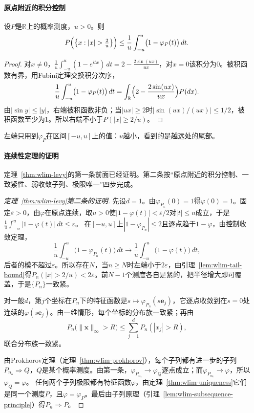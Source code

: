 \paragraph{原点附近的积分控制}
\begin{lemma}[尾部概率的特征函数界]
\label{lem:wlim-tail-bound}
设$P$是$\mathbb R$上的概率测度，$u>0$。则
\[
  P\Bigl(\bigl\{x:|x|>\tfrac2u\bigr\}\Bigr)\leq\frac1u\int_{-u}^u\bigl(1-\varphi_P(t)\bigr)\,dt.
\]
\end{lemma}

\begin{proof}
对$x\neq0$，$\frac1u\int_{-u}^u(1-e^{itx})\,dt=2-\frac{2\sin(ux)}{ux}$，对$x=0$该积分为$0$。被积函数有界，用Fubini定理交换积分次序，
\[
  \frac1u\int_{-u}^u\bigl(1-\varphi_P(t)\bigr)\,dt=\int_{\mathbb R}\Bigl(2-\frac{2\sin(ux)}{ux}\Bigr)P(dx).
\]
由$|\sin y|\leq|y|$，右端被积函数非负；当$|ux|\geq2$时$|\sin(ux)/(ux)|\leq1/2$，被积函数至少为$1$。所以右端不小于$P(|x|\geq2/u)$。
\end{proof}

左端只用到$\varphi_P$在区间$[-u,u]$上的值：$u$越小，看到的是越远处的尾部。

\paragraph{连续性定理的证明}
定理~\ref{thm:wlim-levy}的第一条前面已经证明。第二条按“原点附近的积分控制、一致紧性、弱收敛子列、极限唯一”四步完成。

\begin{proof}[定理~\ref{thm:wlim-levy}第二条的证明]
先设$d=1$。由$\varphi_{P_n}(0)=1$得$\varphi(0)=1$。固定$\varepsilon>0$，由$\varphi$在原点连续，取$u>0$使$|1-\varphi(t)|<\varepsilon/2$对$|t|\leq u$成立，于是$\frac1u\int_{-u}^u|1-\varphi(t)|\,dt\leq\varepsilon$。
在$[-u,u]$上$|1-\varphi_{P_n}|\leq2$且逐点趋于$1-\varphi$，由控制收敛定理，
\[
  \frac1u\int_{-u}^u\bigl(1-\varphi_{P_n}(t)\bigr)\,dt\to\frac1u\int_{-u}^u\bigl(1-\varphi(t)\bigr)\,dt,
\]
后者的模不超过$\varepsilon$。所以存在$N$，当$n\geq N$时左端小于$2\varepsilon$，由引理~\ref{lem:wlim-tail-bound}得$P_n(|x|>2/u)<2\varepsilon$。前$N-1$个测度各自是紧的，把半径增大即可覆盖，于是$\{P_n\}$一致紧。

对一般$d$，第$j$个坐标在$P_n$下的特征函数是$s\mapsto\varphi_{P_n}(s\bm e_j)$，它逐点收敛到在$s=0$处连续的$\varphi(s\bm e_j)$。由一维情形，每个坐标的分布族一致紧；再由
\[
  P_n\bigl(\lVert\bm x\rVert_\infty>R\bigr)\leq\sum_{j=1}^dP_n(|x_j|>R),
\]
联合分布族一致紧。

由Prokhorov定理（定理~\ref{thm:wlim-prokhorov}），每个子列都有进一步的子列$P_{n_k}\Rightarrow Q$，$Q$是某个概率测度。由第一条，$\varphi_{P_{n_k}}\to\varphi_Q$逐点成立；而$\varphi_{P_{n_k}}\to\varphi$，所以$\varphi_Q=\varphi$。
任何两个子列极限都有特征函数$\varphi$，由定理~\ref{thm:wlim-uniqueness}它们是同一个测度$P$，且$\varphi=\varphi_P$。最后由子列原理（引理~\ref{lem:wlim-subsequence-principle}）得$P_n\Rightarrow P$。
\end{proof}

